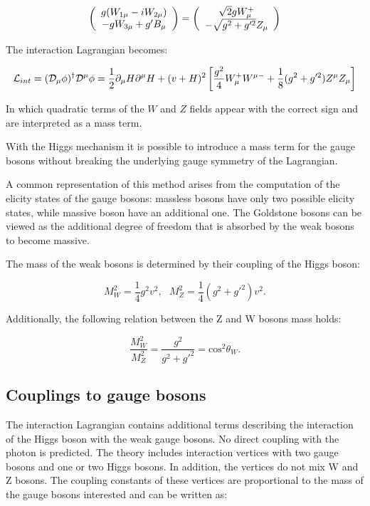 \begin{equation}
\left(\begin{array}{c}g(W_{1\mu} - i W_{2\mu}) \\-g W_{3\mu} + g'B_\mu\end{array}\right) = \left(\begin{array}{c}\sqrt{2} g W^+_{\mu} \\-\sqrt{g^2+g'^2}Z_\mu\end{array}\right)
\end{equation}

The interaction Lagrangian becomes:

\begin{equation}
\mathcal{L}_{int} = (\mathcal{D}_\mu\phi)^\dagger\mathcal{D}^\mu\phi = \frac{1}{2}\partial_{\mu}H\partial^{\mu}H+(v+H)^2\left[\frac{g^2}{4}W^+_{\mu}W^{\mu-} + \frac{1}{8}(g^2+g'^2) Z^{\mu}Z_{\mu}\right ]
\end{equation}

In which quadratic terms of the $W$ and $Z$ fields appear with the correct sign and are interpreted as a mass term. 

With the Higgs mechanism it is possible to introduce a mass term for the gauge bosons without breaking the underlying gauge symmetry of the Lagrangian. 

A common representation of this method arises from the computation of the elicity states of the gauge bosons: massless bosons have only two possible elicity states, while massive boson have an additional one. The Goldstone bosons can be viewed as the additional degree of freedom that is absorbed by the weak bosons to become massive.

The mass of the weak bosons is determined by their coupling of the Higgs boson: 

\begin{equation}
M^2_W=\frac{1}{4}g^2v^2, \, \, \, \, M^2_Z=\frac{1}{4}(g^2+g'^2)v^2.
\end{equation}

Additionally, the following relation between the Z and W bosons mass holds:

\begin{equation}
\frac{M_W^2}{M_Z^2}=\frac{g^2}{g^2+g'^2}=\operatorname{cos^2}\theta_W.
\end{equation}

\subsection{Couplings to gauge bosons}

The interaction Lagrangian contains additional terms describing the interaction of the Higgs boson with the weak gauge bosons. No direct coupling with the photon is predicted. The theory includes interaction vertices with two gauge bosons and one or two Higgs bosons. In addition, the vertices do not mix W and Z bosons. The coupling constants of these vertices are proportional to the mass of the gauge bosons interested and can be written as:

